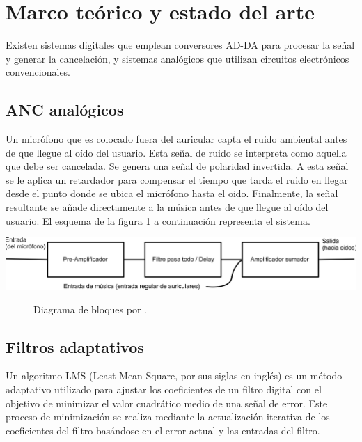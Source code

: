 \documentclass[a4paper,12pt]{article}
\begin{document}
\section{Marco teórico y estado del arte}
\label{sec:background}

Existen sistemas digitales que emplean conversores AD-DA para procesar la señal y generar la cancelación, y sistemas analógicos que utilizan circuitos electrónicos convencionales.

\subsection{ANC analógicos}

Un micrófono que es colocado fuera del auricular capta el ruido ambiental antes de que llegue al oído del usuario.
Esta señal de ruido se interpreta como aquella que debe ser cancelada.
Se genera una señal de polaridad invertida. A esta señal se le aplica un retardador para compensar el tiempo que tarda el ruido en llegar desde el punto donde se ubica el micrófono hasta el oido.
Finalmente, la señal resultante se añade directamente a la música antes de que llegue al oído del usuario.
El esquema de la figura \ref{fig:Kotlicki2016} a continuación representa el sistema.

\begin{center}
    \includegraphics[width=\linewidth]{images/analog_ANC.png}
\end{center}
\vspace{\captionSpace}
\begin{figure}[H]
    \caption{Diagrama de bloques por \textcite{Kotlicki2016}.}
    \label{fig:Kotlicki2016}
\end{figure}

\subsection{Filtros adaptativos}

Un algoritmo LMS (Least Mean Square, por sus siglas en inglés) es un método adaptativo utilizado para ajustar los coeficientes de un filtro digital con el objetivo de minimizar el valor cuadrático medio de una señal de error.
Este proceso de minimización se realiza mediante la actualización iterativa de los coeficientes del filtro basándose en el error actual y las entradas del filtro.
\end{document}
